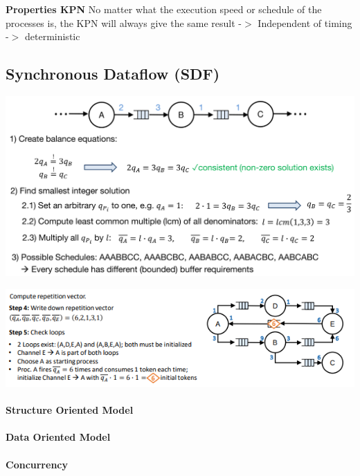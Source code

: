 \documentclass[english]{latex4ei/latex4ei_sheet}
\begin{document}
\textbf{Properties KPN} No matter what the execution speed or schedule of the processes is, the KPN will always give the same result -$>$ Independent of timing -$>$ deterministic

\subsection{Synchronous Dataflow (SDF)}

\begin{center}
  \includegraphics[width=\linewidth]{assets/SDFExample.png}
  \label{fig:sdfexample}
\end{center}
 
\begin{center}
  \includegraphics[width=\linewidth]{assets/SDFExample2.png}
  \label{fig:sdfexample2}
\end{center}

\paragraph{Structure Oriented Model}

\paragraph{Data Oriented Model}

\paragraph{Concurrency}
\end{document}
